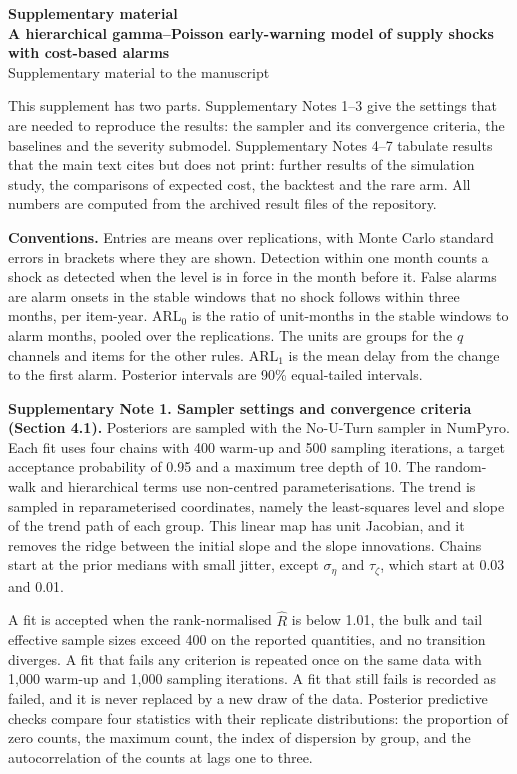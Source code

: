 \documentclass[10pt,a4paper]{article}
\begin{document}
{\large\bfseries Supplementary material}\\[2pt]
{\bfseries A hierarchical gamma--Poisson early-warning model of supply shocks with cost-based alarms}\\[1pt]
{\small Supplementary material to the manuscript}

This supplement has two parts. Supplementary Notes 1--3 give the settings that are needed to reproduce the results: the sampler and its convergence criteria, the baselines and the severity submodel. Supplementary Notes 4--7 tabulate results that the main text cites but does not print: further results of the simulation study, the comparisons of expected cost, the backtest and the rare arm. All numbers are computed from the archived result files of the repository.

\textbf{Conventions.} Entries are means over replications, with Monte Carlo standard errors in brackets where they are shown. Detection within one month counts a shock as detected when the level is in force in the month before it. False alarms are alarm onsets in the stable windows that no shock follows within three months, per item-year. ARL$_0$ is the ratio of unit-months in the stable windows to alarm months, pooled over the replications. The units are groups for the $q$ channels and items for the other rules. ARL$_1$ is the mean delay from the change to the first alarm. Posterior intervals are 90\% equal-tailed intervals.

\textbf{Supplementary Note 1. Sampler settings and convergence criteria (Section 4.1).}
Posteriors are sampled with the No-U-Turn sampler in NumPyro. Each fit uses four chains with 400 warm-up and 500 sampling iterations, a target acceptance probability of 0.95 and a maximum tree depth of 10. The random-walk and hierarchical terms use non-centred parameterisations. The trend is sampled in reparameterised coordinates, namely the least-squares level and slope of the trend path of each group. This linear map has unit Jacobian, and it removes the ridge between the initial slope and the slope innovations. Chains start at the prior medians with small jitter, except $\sigma_\eta$ and $\tau_\zeta$, which start at 0.03 and 0.01.

A fit is accepted when the rank-normalised $\widehat{R}$ is below 1.01, the bulk and tail effective sample sizes exceed 400 on the reported quantities, and no transition diverges. A fit that fails any criterion is repeated once on the same data with 1,000 warm-up and 1,000 sampling iterations. A fit that still fails is recorded as failed, and it is never replaced by a new draw of the data. Posterior predictive checks compare four statistics with their replicate distributions: the proportion of zero counts, the maximum count, the index of dispersion by group, and the autocorrelation of the counts at lags one to three.
\end{document}
